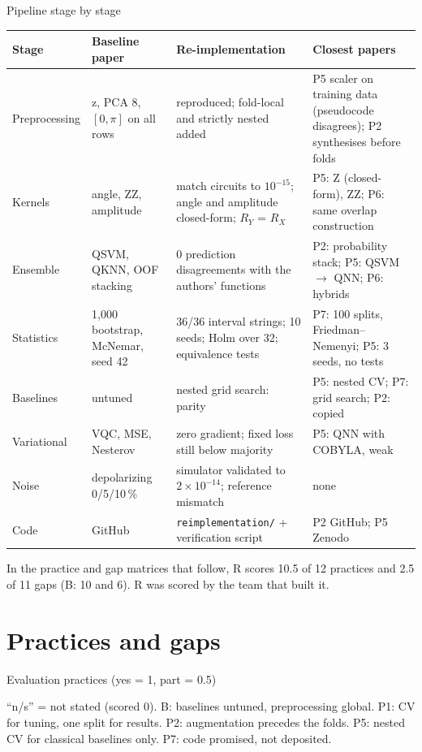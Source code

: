 \documentclass[aspectratio=169,10pt,t,xcolor={table}]{beamer}
\newcommand{\tabdir}{../reimplementation/tex/papers/}
\begin{document}
\begin{frame}{Pipeline stage by stage}
\centering\tiny
\begin{tabularx}{\textwidth}{L{1.8cm} L{3.1cm} Y L{3.6cm}}
\toprule
Stage & Baseline paper & Re-implementation & Closest papers \\
\midrule
Preprocessing & z, PCA 8, $[0,\pi]$ on all rows & reproduced; fold-local and strictly nested added & P5 scaler on training data (pseudocode disagrees); P2 synthesises before folds \\
Kernels & angle, ZZ, amplitude & match circuits to $10^{-15}$; angle and amplitude closed-form; $R_Y$ = $R_X$ & P5: Z (closed-form), ZZ; P6: same overlap construction \\
Ensemble & QSVM, QKNN, OOF stacking & 0 prediction disagreements with the authors' functions & P2: probability stack; P5: QSVM $\to$ QNN; P6: hybrids \\
Statistics & 1,000 bootstrap, McNemar, seed 42 & 36/36 interval strings; 10 seeds; Holm over 32; equivalence tests & P7: 100 splits, Friedman--Nemenyi; P5: 3 seeds, no tests \\
Baselines & untuned & nested grid search: parity & P5: nested CV; P7: grid search; P2: copied \\
Variational & VQC, MSE, Nesterov & zero gradient; fixed loss still below majority & P5: QNN with COBYLA, weak \\
Noise & depolarizing 0/5/10\,\% & simulator validated to $2\times10^{-14}$; reference mismatch & none \\
Code & GitHub & \texttt{reimplementation/} + verification script & P2 GitHub; P5 Zenodo \\
\bottomrule
\end{tabularx}
\par\medskip\raggedright\footnotesize
In the practice and gap matrices that follow, R scores 10.5 of 12 practices and 2.5 of 11 gaps (B: 10 and 6). R was scored by the team that built it.
\end{frame}

\section{Practices and gaps}
\begin{frame}{Evaluation practices (yes = 1, part = 0.5)}
\centering
\begin{adjustbox}{max width=\textwidth}

\end{adjustbox}
\par\medskip\raggedright\scriptsize
``n/s'' = not stated (scored 0). B: baselines untuned, preprocessing global. P1: CV for tuning, one split for results. P2: augmentation precedes the folds. P5: nested CV for classical baselines only. P7: code promised, not deposited.
\end{frame}
\end{document}
